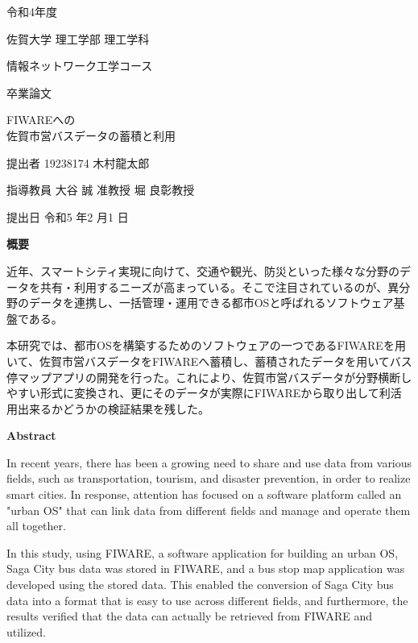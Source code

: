 \documentclass[a4paper, 12pt]{jsreport}
\begin{document}
  \begin{titlepage}
    \begin{center}
      {\Large 令和4年度}
      \vspace{10truept}


      {\Large 佐賀大学 理工学部 理工学科}
      \vspace{10truept}


      {\Large 情報ネットワーク工学コース}
      \vspace{10truept}


      {\Large 卒業論文}
      \vspace*{100truept}


      {\huge FIWAREへの\\ 佐賀市営バスデータの蓄積と利用}
      \vspace{160truept}


      {\Large 提出者 19238174 木村龍太郎}
      \vspace{10truept}


      {\Large 指導教員 大谷 誠 准教授 堀 良彰教授}
      \vspace{70truept}


      {\Large 提出日 令和5 年2 月1 日}
    \end{center}
  \end{titlepage}

  \begin{center}
    \bf 概要
  \end{center}
  \par
  近年、スマートシティ実現に向けて、交通や観光、防災といった様々な分野のデータを共有・利用するニーズが高まっている。そこで注目されているのが、異分野のデータを連携し、一括管理・運用できる都市OSと呼ばれるソフトウェア基盤である。
  \par
  本研究では、都市OSを構築するためのソフトウェアの一つであるFIWAREを用いて、佐賀市営バスデータをFIWAREへ蓄積し、蓄積されたデータを用いてバス停マップアプリの開発を行った。これにより、佐賀市営バスデータが分野横断しやすい形式に変換され、更にそのデータが実際にFIWAREから取り出して利活用出来るかどうかの検証結果を残した。

  \begin{center}
    \bf Abstract
  \end{center}
  \par In recent years, there has been a growing need to share and use data from
  various fields, such as transportation, tourism, and disaster prevention, in
  order to realize smart cities. In response, attention has focused on a
  software platform called an "urban OS" that can link data from different
  fields and manage and operate them all together. \par In this study, using
  FIWARE, a software application for building an urban OS, Saga City bus data
  was stored in FIWARE, and a bus stop map application was developed using the stored
  data. This enabled the conversion of Saga City bus data into a format that is
  easy to use across different fields, and furthermore, the results verified
  that the data can actually be retrieved from FIWARE and utilized.
\end{document}
